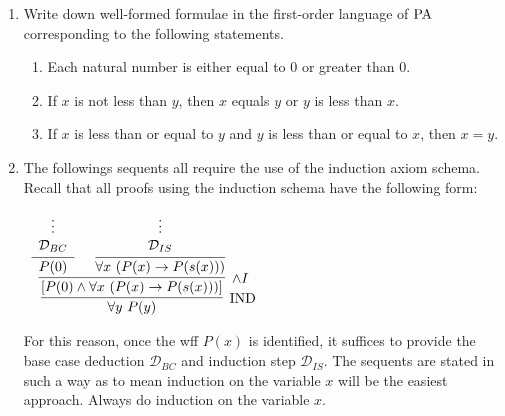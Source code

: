 \documentclass[11pt]{report}
\begin{document}
\begin{enumerate}
	Write down a wff in $\PA$ which defines the binary relation $<$ of being ``strictly less than''. Use this to write down formulae that represent: less than or equal to, strictly greater than, and greater than or equal to. 


	\item Write down well-formed formulae in the first-order language of $\PA$ corresponding to the following statements. 
	
	\begin{enumerate}
		\item Each natural number is either equal to $0$ or greater than $0$. 			
		\item If $x$ is not less than $y$, then $x$ equals $y$ or $y$ is less than $x$.
		\item If $x$ is less than or equal to $y$ and $y$ is less than or equal to $x$, then $x=y$. 
	\end{enumerate} 

	\newpage
	\item The followings sequents all require the use of the induction axiom schema. Recall that all proofs using the induction schema have the following form: 
	
		\begin{mdframed}
			\begin{center}
				$\begin{array}{c}
					\infer[\IND]{\forall y \ P(y)}
						{\infer[\land I]{[P(0) \land \forall x \ (P(x) \to P(s(x)))]}
							{\infer[]{P(0)}{\begin{array}{c} \vdots \\ \mathcal{D}_{BC}\end{array}}
							&
							\infer[]{\forall x \ (P(x) \to P(s(x)))}
								{\begin{array}{c} \vdots \\ \mathcal{D}_{IS}\end{array}}}}
				\end{array}$
			\end{center}
		\end{mdframed}

	For this reason, once the wff $P(x)$ is identified, it suffices to provide the base case deduction $\mathcal{D}_{BC}$ and induction step $\mathcal{D}_{IS}$. The sequents are stated in such a way as to mean induction on the variable $x$ will be the easiest approach. Always do induction on the variable $x$.  
	

\end{enumerate}
\end{document}
